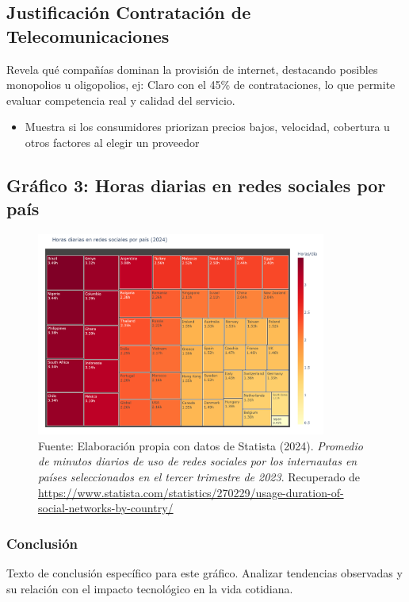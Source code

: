 \documentclass[12pt, a4paper]{article}
\begin{document}
\subsection{Justificación Contratación de Telecomunicaciones}
Revela qué compañías dominan la provisión de internet, destacando posibles monopolios u oligopolios, ej: Claro con el 45\% de contrataciones, lo que permite evaluar competencia real y calidad del servicio.

\begin{itemize}
    \item Muestra si los consumidores priorizan precios bajos, velocidad, cobertura u otros factores al elegir un proveedor
\end{itemize}
\subsection*{Gráfico 3: Horas diarias en redes sociales por país}
\begin{figure}[H]
    \centering
    \includegraphics[width=0.85\textwidth]{images/graph1_JG.png}
    \caption{
        Fuente: Elaboración propia con datos de Statista (2024). 
        \textit{Promedio de minutos diarios de uso de redes sociales por los internautas en países seleccionados en el tercer trimestre de 2023}. 
        Recuperado de \url{https://www.statista.com/statistics/270229/usage-duration-of-social-networks-by-country/}
    }
\end{figure}


\subsubsection*{Conclusión}
Texto de conclusión específico para este gráfico. Analizar tendencias observadas y su relación con el impacto tecnológico en la vida cotidiana.
\end{document}
